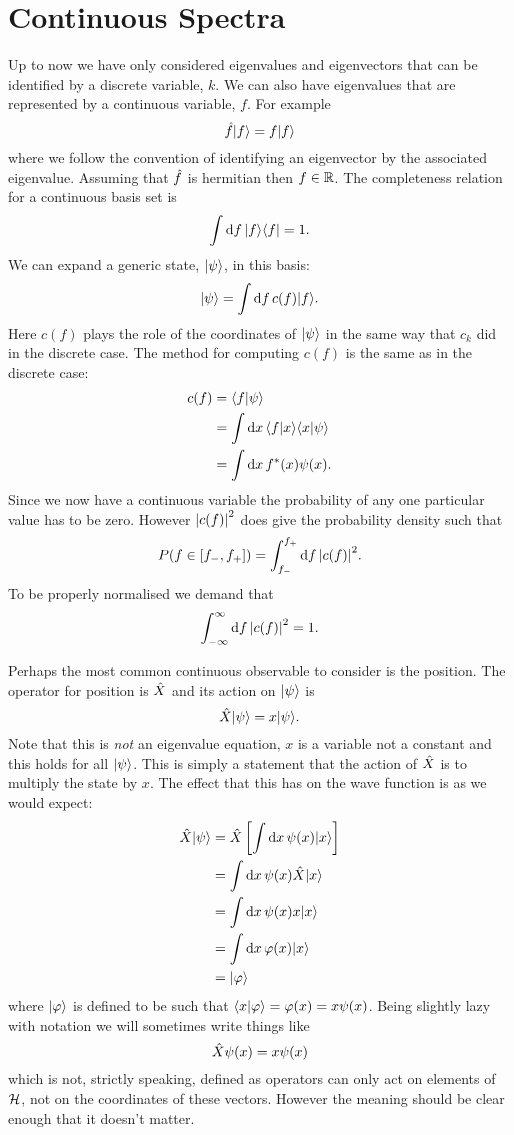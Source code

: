     \section{Continuous Spectra}
    Up to now we have only considered eigenvalues and eigenvectors that can be identified by a discrete variable, \(k\).
    We can also have eigenvalues that are represented by a continuous variable, \(f\).
    For example
    \[\hat{f}\vert {f} \rangle = f\vert {f} \rangle\]
    where we follow the convention of identifying an eigenvector by the associated eigenvalue.
    Assuming that \(\hat{f}\) is hermitian then \(f\in\mathbb{R}\).
    The completeness relation for a continuous basis set is
    \[\int\dd{f}\vert {f}\rangle\langle {f} \vert = 1.\]
    We can expand a generic state, \(\vert {\psi} \rangle\), in this basis:
    \[\vert {\psi} \rangle = \int\dd{f} c(f)\vert {f} \rangle.\]
    Here \(c(f)\) plays the role of the coordinates of \(\vert {\psi} \rangle\) in the same way that \(c_k\) did in the discrete case.
    The method for computing \(c(f)\) is the same as in the discrete case:
    \begin{align*}
        c(f) &= \langle {f} \vert {\psi} \rangle\\
        &= \int\dd{x} \langle {f} \vert {x} \rangle\langle {x} \vert {\psi} \rangle\\
        &= \int\dd{x} f^*(x)\psi(x).
    \end{align*}
    Since we now have a continuous variable the probability of any one particular value has to be zero.
    However \(\abs{c(f)}^2\) does give the probability density such that
    \[P(f\in[f_-, f_+]) = \int_{f_-}^{f_+} \dd{f} \abs{c(f)}^2.\]
    To be properly normalised we demand that
    \[\int_{-\infty}^{\infty} \dd{f}\abs{c(f)}^2 = 1.\]
    
    Perhaps the most common continuous observable to consider is the position.
    The operator for position is \(\hat{X}\) and its action on \(\vert {\psi} \rangle\) is
    \[\hat{X}\vert {\psi} \rangle = x\vert {\psi} \rangle.\]
    Note that this is \emph{not} an eigenvalue equation, \(x\) is a variable not a constant and this holds for all \(\vert {\psi} \rangle\).
    This is simply a statement that the action of \(\hat{X}\) is to multiply the state by \(x\).
    The effect that this has on the wave function is as we would expect:
    \begin{align*}
        \hat{X}\vert {\psi} \rangle &= \hat{X}\left[\int\dd{x} \psi(x)\vert {x} \rangle\right]\\
        &= \int\dd{x} \psi(x)\hat{X}\vert {x} \rangle\\
        &= \int\dd{x} \psi(x)x\vert {x} \rangle\\
        &= \int\dd{x} \varphi(x)\vert {x} \rangle\\
        &= \vert {\varphi} \rangle
    \end{align*}
    where \(\vert {\varphi} \rangle\) is defined to be such that \(\langle {x} \vert {\varphi} \rangle = \varphi(x) = x\psi(x)\).
    Being slightly lazy with notation we will sometimes write things like
    \[\hat{X}\psi(x) = x\psi(x)\]
    which is not, strictly speaking, defined as operators can only act on elements of \(\mathcal{H}\), not on the coordinates of these vectors.
    However the meaning should be clear enough that it doesn't matter.
    
